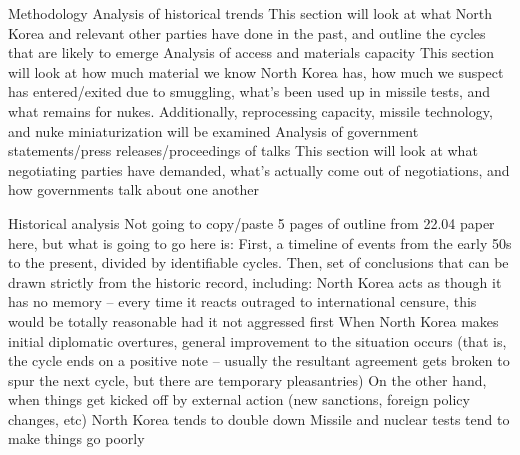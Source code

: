\documentclass{article}
\begin{document}
\begin{outline}[enumerate]
\1 Methodology
    \2 Analysis of historical trends
        \3 This section will look at what North Korea and relevant other parties have done in the past, and outline the cycles that are likely to emerge
        \3 Analysis of access and materials capacity
            \4 This section will look at how much material we know North Korea has, how much we suspect has entered/exited due to smuggling, what’s been used up in missile tests, and what remains for nukes.
            \4 Additionally, reprocessing capacity, missile technology, and nuke miniaturization will be examined
        \3 Analysis of government statements/press releases/proceedings of talks
            \4 This section will look at what negotiating parties have demanded, what’s actually come out of negotiations, and how governments talk about one another

\1 Historical analysis
    \2 Not going to copy/paste 5 pages of outline from  22.04 paper here, but what is going to go here is:
        \3 First, a timeline of events from the early 50s to the present, divided by identifiable cycles.
        \3 Then, set of conclusions that can be drawn strictly from the historic record, including:
            \4 North Korea acts as though it has no memory – every time it reacts outraged to international censure, this would be totally reasonable had it not aggressed first
            \4 When North Korea makes initial diplomatic overtures, general improvement to the situation occurs (that is, the cycle ends on a positive note – usually the resultant agreement gets broken to spur the next cycle, but there are temporary pleasantries)
            \4 On the other hand, when things get kicked off by external action (new sanctions, foreign policy changes, etc) North Korea tends to double down
            \4 Missile and nuclear tests tend to make things go poorly
            

\end{outline}
\end{document}
